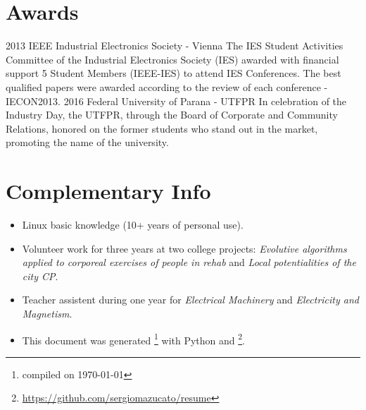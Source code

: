 \documentclass[]{friggeri-cv}
\begin{document}
\section{Awards}
\begin{entrylist}
 
  \entry
    {2013}
    {IEEE Industrial Electronics Society - Vienna}
    {}
    {The IES Student Activities Committee of the Industrial Electronics Society (IES) awarded with financial support 5 Student Members (IEEE-IES) to attend IES Conferences. The best qualified papers were awarded according to the review of each conference - IECON2013.}
    \entry
    {2016}
    {Federal University of Parana - UTFPR}
    {}
    {In celebration of the Industry Day, the UTFPR, through the Board of Corporate and Community Relations, honored on the former students who stand out in the market, promoting the name of the university.}
\end{entrylist}

%



\section{Complementary Info}

\begin{itemize}
	\item Linux basic knowledge (10+ years of personal use).
	\item Volunteer work for three years at two college projects: \textit{ Evolutive algorithms applied to corporeal exercises of people in rehab} and \textit{Local potentialities of the city CP}.
	\item Teacher assistent during one year for \textit{Electrical Machinery} and \textit{Electricity and Magnetism}.
	\item This document was generated \footnote{compiled on \today} with Python and \myfont{\LaTeX} \footnote{\url{https://github.com/sergiomazucato/resume}}.
\end{itemize}

\end{document}

